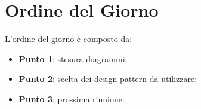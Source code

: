 \section{Ordine del Giorno}
L'ordine del giorno è composto da: 
\begin{itemize}
	\item \textbf{Punto 1}: stesura diagrammi;
	\item \textbf{Punto 2}: scelta dei design pattern da utilizzare; 
	\item \textbf{Punto 3}: prossima riunione.
\end{itemize}